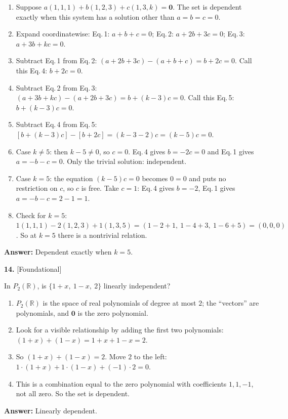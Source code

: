 \documentclass[11pt]{article}
\begin{document}
\begin{tcolorbox}[breakable,colback=ans,colframe=ansb,boxrule=0.5pt,left=4pt,right=4pt,top=2pt,bottom=2pt]\begin{enumerate}[leftmargin=2.2em,itemsep=1pt,topsep=1pt,label=\textbf{Step \arabic*.}]\item Suppose $a(1,1,1)+b(1,2,3)+c(1,3,k)=\mathbf 0$. The set is dependent exactly when this system has a solution other than $a=b=c=0$.
\item Expand coordinatewise: Eq.\,1: $a+b+c=0$; Eq.\,2: $a+2b+3c=0$; Eq.\,3: $a+3b+kc=0$.
\item Subtract Eq.\,1 from Eq.\,2: $(a+2b+3c)-(a+b+c)=b+2c=0$. Call this Eq.\,4: $b+2c=0$.
\item Subtract Eq.\,2 from Eq.\,3: $(a+3b+kc)-(a+2b+3c)=b+(k-3)c=0$. Call this Eq.\,5: $b+(k-3)c=0$.
\item Subtract Eq.\,4 from Eq.\,5: $[b+(k-3)c]-[b+2c]=(k-3-2)c=(k-5)c=0$.
\item Case $k\neq5$: then $k-5\ne0$, so $c=0$. Eq.\,4 gives $b=-2c=0$ and Eq.\,1 gives $a=-b-c=0$. Only the trivial solution: independent.
\item Case $k=5$: the equation $(k-5)c=0$ becomes $0=0$ and puts no restriction on $c$, so $c$ is free. Take $c=1$: Eq.\,4 gives $b=-2$, Eq.\,1 gives $a=-b-c=2-1=1$.
\item Check for $k=5$: $1(1,1,1)-2(1,2,3)+1(1,3,5)=(1-2+1,\ 1-4+3,\ 1-6+5)=(0,0,0)$ \checkmark. So at $k=5$ there is a nontrivial relation.
\end{enumerate}\textbf{Answer:} Dependent exactly when $k=5$.\end{tcolorbox}
\par\vspace{2pt}
\begin{minipage}{\linewidth}\textbf{14.} \hfill{\scriptsize\color{ink}[Foundational]}\par\nopagebreak In $P_{2}(\mathbb{R})$, is $\{1+x,\ 1-x,\ 2\}$ linearly independent?
\end{minipage}\par\nopagebreak
\begin{tcolorbox}[breakable,colback=ans,colframe=ansb,boxrule=0.5pt,left=4pt,right=4pt,top=2pt,bottom=2pt]\begin{enumerate}[leftmargin=2.2em,itemsep=1pt,topsep=1pt,label=\textbf{Step \arabic*.}]\item $P_{2}(\mathbb{R})$ is the space of real polynomials of degree at most $2$; the ``vectors'' are polynomials, and $\mathbf 0$ is the zero polynomial.
\item Look for a visible relationship by adding the first two polynomials: $(1+x)+(1-x)=1+x+1-x=2$.
\item So $(1+x)+(1-x)=2$. Move $2$ to the left: $1\cdot(1+x)+1\cdot(1-x)+(-1)\cdot2=0$.
\item This is a combination equal to the zero polynomial with coefficients $1,1,-1$, not all zero. So the set is dependent.
\end{enumerate}\textbf{Answer:} Linearly dependent.\end{tcolorbox}
\end{document}

